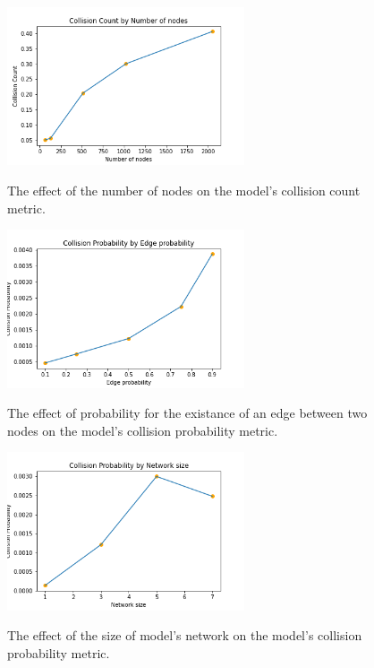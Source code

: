 \documentclass{article}
\begin{document}
\begin{figure}
    \begin{center}
        \includegraphics[width=7cm]{../figures/Collision_Count_num_nodes.png}\\
        \caption{The effect of the number of nodes on the model's collision count metric.}
    \end{center}
\end{figure}    
\begin{figure}
    \begin{center}
        \includegraphics[width=7cm]{../figures/Collision_Probability_edge_prob.png}\\
        \caption{The effect of probability for the existance of an edge between two nodes on the model's collision probability metric.}
    \end{center}
\end{figure}    
\begin{figure}
    \begin{center}
        \includegraphics[width=7cm]{../figures/Collision_Probability_network_size.png}\\
        \caption{The effect of the size of model's network on the model's collision probability metric.}
    \end{center}
\end{figure}    
\end{document}

